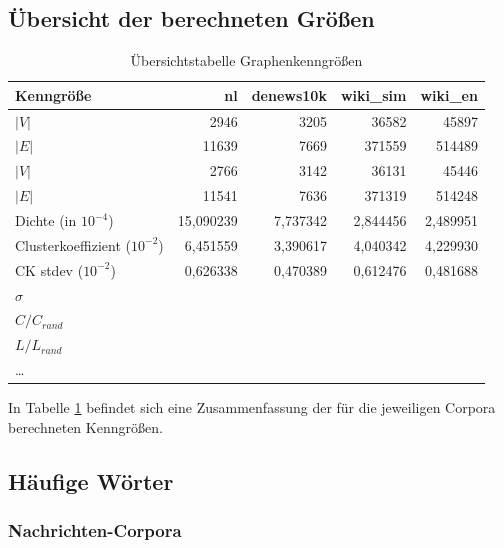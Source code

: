 \documentclass[11pt, a4paper]{article}
\begin{document}
\subsection{Übersicht der berechneten Größen}
\begin{table}[ht]
    \begin{tabular}{l*{4}{r}}
    \toprule
    Kenngröße & nl & denews10k & wiki\_sim & wiki\_en \\
    \midrule
    $|V|$                       & 2946      & 3205      & 36582     & 45897  \\
    $|E|$                       & 11639     & 7669      & 371559    & 514489 \\
    $|V|$\footnotemark[6]       & 2766      & 3142      & 36131     & 45446  \\
    $|E|$\footnotemark[6]       & 11541     & 7636      & 371319    & 514248 \\
    Dichte (in $10^{-4}$)       & 15,090239 & 7,737342  & 2,844456  & 2,489951 \\
    Clusterkoeffizient ($10^{-2}$) & 6,451559 & 3,390617 & 4,040342  & 4,229930 \\
    CK stdev ($10^{-2}$)        & 0,626338 & 0,470389 & 0,612476  & 0,481688 \\
    $\sigma$                    &           &           &           &         \\
    $C / C_{rand}$               &           &           &           &         \\
    $L / L_{rand}$               &           &           &           &         \\
    \dots                       &           &           &           &          \\
    \bottomrule
    \end{tabular}
    \caption{Übersichtstabelle Graphenkenngrößen}
    \label{tab-zsf}
\end{table}

In Tabelle \ref{tab-zsf} befindet sich eine Zusammenfassung der für die
jeweiligen Corpora berechneten Kenngrößen.


\subsection{H\"aufige W\"orter}

\subsubsection{Nachrichten-Corpora}
\end{document}

